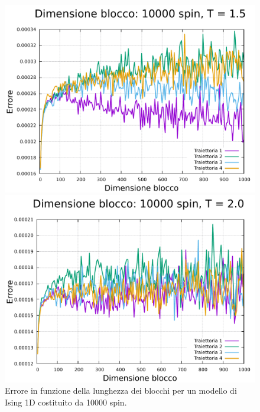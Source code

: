 \begin{figure}[htbp]
    \begin{minipage}{0.45\textwidth}  
      \centering
      \includegraphics[page=1, width=\textwidth]{Immagini/simIsing1D/magn0.02/lblk/err_10000_1.5.pdf}
      \caption{$T\,=\,1.5$}
    \end{minipage}\hfill
    \begin{minipage}{0.45\textwidth}  
      \centering
      \includegraphics[page=1, width=\textwidth]{Immagini/simIsing1D/magn0.02/lblk/err_10000_2.0.pdf}
      \caption{$T\,=\,2.0$}
    \end{minipage}
    \caption{Errore in funzione della lunghezza dei blocchi per un modello di Ising 1D costituito da 10000 spin.}
\end{figure}

\vspace*{\fill}

\newpage
